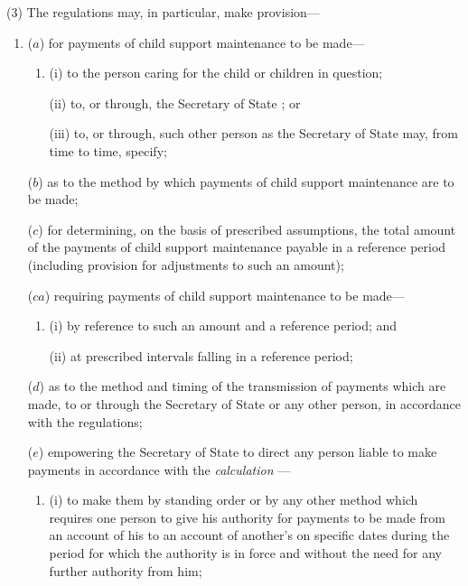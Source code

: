 \documentclass[12pt,a4paper]{article}
\begin{document}
(3) The regulations may, in particular, make provision—
\begin{enumerate}\item[]
($a$) for payments of child support maintenance to be made—
\begin{enumerate}\item[]
(i) to the person caring for the child or children in question;

(ii) to, or through, the 
Secretary of State%
; or

(iii) to, or through, such other person as the 
Secretary of State  %
may, from time to time, specify;
\end{enumerate}

($b$) as to the method by which payments of child support maintenance are to be made;


($c$) for determining, on the basis of prescribed assumptions, the total amount of the payments of child support maintenance payable in a reference period (including provision for adjustments to such an amount);

($ca$) requiring payments of child support maintenance to be made—
\begin{enumerate}\item[]
(i) by reference to such an amount and a reference period; and

(ii) at prescribed intervals falling in a reference period;
\end{enumerate}

($d$) as to the method and timing of the transmission of payments which are made, to or through the 
Secretary of State  %
or any other person, in accordance with the regulations;

($e$) empowering the 
Secretary of State  %
to direct any person liable to make payments in accordance with the 
\emph{calculation}%
—
\begin{enumerate}\item[]
(i) to make them by standing order or by any other method which requires one person to give his authority for payments to be made from an account of his to an account of another’s on specific dates during the period for which the authority is in force and without the need for any further authority from him;


\end{enumerate}
\end{enumerate}
\end{document}
